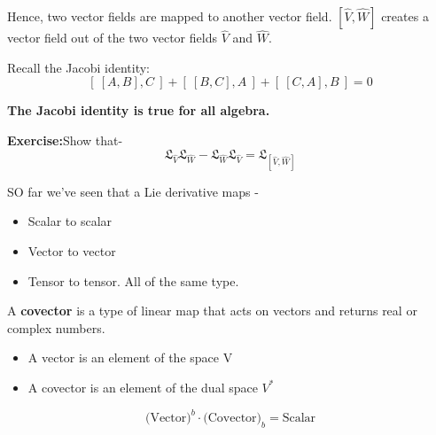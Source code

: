 \documentclass[14pt]{article} %
\begin{document}
Hence, two vector fields are mapped to another vector field. 
$[ \hat{V}, \hat{W}]$ creates a vector field out of the two vector fields $\hat{V}$ and $\hat{W}$.
\begin{tcolorbox}[ title=Note:]
Recall the Jacobi identity:
\[
\left[~ [ A, B], C~ \right] + \left[ ~[ B, C], A~ \right] + \left[~[ C, A ], B~ \right] = 0
\]
\begin{center}
    \textbf{The Jacobi identity is true for all algebra.}
\end{center}
\end{tcolorbox}
\begin{framed}
\noindent
\textbf{Exercise:}\quad Show that-
\[
\mathfrak{L}_{\hat{V}} \mathfrak{L}_{\hat{W}} - \mathfrak{L}_{\hat{W}} \mathfrak{L}_{\hat{V}} = \mathfrak{L}_{[\hat{V},\hat{W}]}
\]
\end{framed}
SO far we've seen that a Lie derivative maps -
\begin{itemize}
    \item Scalar to scalar
    \item Vector to vector
    \item Tensor to tensor. All of the same type.
\end{itemize}
\begin{tcolorbox}[ title=Covector]
A \textbf{covector} is a type of linear map that acts on vectors and returns real or complex numbers.
\begin{itemize}
    \item A vector is an element of the space V
    \item A covector is an element of the dual space $V^*$
\end{itemize}
\[
\text{(Vector)}^b \cdot \text{(Covector)}_b = \text{Scalar}
\]
\end{tcolorbox}
\end{document}
